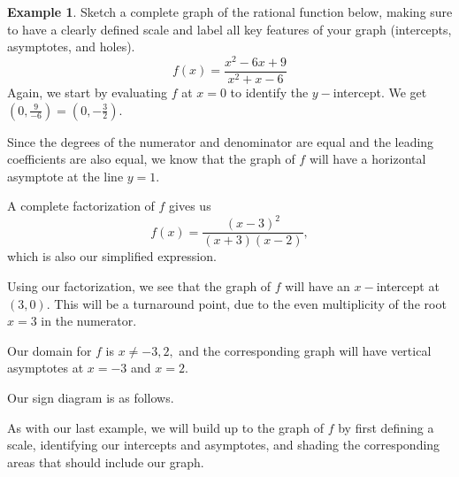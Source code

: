 \documentclass[12pt]{book}
\theoremstyle{definition}
\newtheorem{example}{Example}
\begin{document}
\begin{example}Sketch a complete graph of the rational function below, making sure to have a clearly defined scale and label all key features of your graph (intercepts, asymptotes, and holes).
$$f(x)=\dfrac{x^2-6x+9}{x^2+x-6}$$
Again, we start by evaluating $f$ at $x=0$ to identify the $y-$intercept.  We get $(0,\frac{9}{-6})=(0,-\frac{3}{2})$.
\par
Since the degrees of the numerator and denominator are equal and the leading coefficients are also equal, we know that the graph of $f$ will have a horizontal asymptote at the line $y=1$.
\par
A complete factorization of $f$ gives us
$$f(x)=\dfrac{(x-3)^2}{(x+3)(x-2)},$$
which is also our simplified expression.
\par
Using our factorization, we see that the graph of $f$ will have an $x-$intercept at $(3,0).$  This will be a turnaround point, due to the even multiplicity of the root $x=3$ in the numerator.
\par
Our domain for $f$ is $x\neq -3,2,$ and the corresponding graph will have vertical asymptotes at $x=-3$ and $x=2$.
\par
Our sign diagram is as follows.
\begin{center}
\end{center}
As with our last example, we will build up to the graph of $f$ by first defining a scale, identifying our intercepts and asymptotes, and shading the corresponding areas that should include our graph.
\begin{center}
\end{center}
\end{example}
\end{document}
